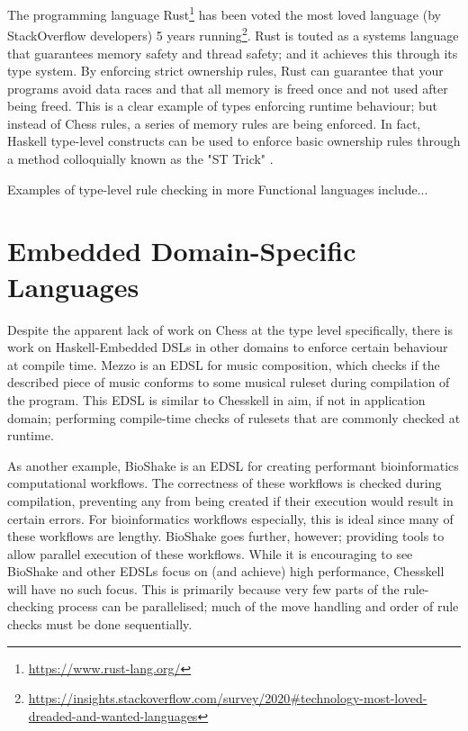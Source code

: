 \documentclass[12pt, a4paper, bibliography=totocnumbered]{scrreprt}
\begin{document}
The programming language Rust\footnote{\url{https://www.rust-lang.org/}} has been voted the most loved language (by StackOverflow developers) 5 years running\footnote{\url{https://insights.stackoverflow.com/survey/2020\#technology-most-loved-dreaded-and-wanted-languages}}. Rust is touted as a systems language that guarantees memory safety and thread safety; and it achieves this through its type system. By enforcing strict ownership rules, Rust can guarantee that your programs avoid data races and that all memory is freed once and not used after being freed. This is a clear example of types enforcing runtime behaviour; but instead of Chess rules, a series of memory rules are being enforced. In fact, Haskell type-level constructs can be used to enforce basic ownership rules through a method colloquially known as the "ST Trick" \cite{twt}.

Examples of type-level rule checking in more Functional languages include... %

\section{Embedded Domain-Specific Languages}

Despite the apparent lack of work on Chess at the type level specifically, there is work on Haskell-Embedded DSLs in other domains to enforce certain behaviour at compile time. Mezzo \cite{mezzohaskellsymposium} is an EDSL for music composition, which checks if the described piece of music conforms to some musical ruleset during compilation of the program. This EDSL is similar to Chesskell in aim, if not in application domain; performing compile-time checks of rulesets that are commonly checked at runtime.

As another example, BioShake \cite{bioshake} is an EDSL for creating performant bioinformatics computational workflows. The correctness of these workflows is checked during compilation, preventing any from being created if their execution would result in certain errors. For bioinformatics workflows especially, this is ideal since many of these workflows are lengthy. BioShake goes further, however; providing tools to allow parallel execution of these workflows. While it is encouraging to see BioShake and other EDSLs \cite{aplite} focus on (and achieve) high performance, Chesskell will have no such focus. This is primarily because very few parts of the rule-checking process can be parallelised; much of the move handling and order of rule checks must be done sequentially.
\end{document}
